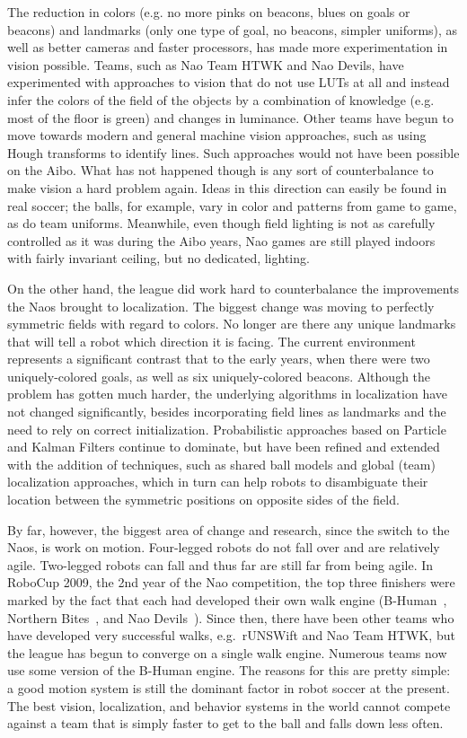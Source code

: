 \documentclass{llncs}
\begin{document}
The reduction in colors (e.g. no more pinks on beacons, blues on goals
or beacons) and landmarks (only one type of goal, no beacons,
simpler uniforms), as well as better cameras and faster processors, has
made more experimentation in vision possible. Teams, such as
Nao Team HTWK and Nao Devils, have experimented with approaches
to vision that do not use LUTs at all and instead infer the colors of the field
of the objects by a combination of knowledge (e.g. most of the floor
is green) and changes in luminance.  Other teams have begun to move towards 
modern and general machine
vision approaches, such as using Hough transforms to identify lines. Such approaches
would not have been possible on the Aibo.
What has not happened though is any sort of counterbalance to make vision
a hard problem again. Ideas in this direction can easily be found
in real soccer; the balls, for example, vary in color and patterns from game
to game, as do team uniforms. Meanwhile, even though field lighting is not as carefully
controlled as it was during the Aibo years, Nao games are still played indoors with
fairly invariant ceiling, but no dedicated, lighting.

On the other hand, the league did work hard to counterbalance the
improvements the Naos brought to localization. The biggest change
was moving to perfectly symmetric fields with regard to colors. No longer
are there any unique landmarks that will tell a robot which direction
it is facing. The current environment represents a significant 
contrast that to the early years, when there were two uniquely-colored
goals, as well as six uniquely-colored beacons. Although the problem has gotten
much harder, the underlying algorithms in localization have not changed significantly,
besides incorporating field lines as landmarks and the need to rely on correct initialization. 
Probabilistic approaches based on Particle and Kalman Filters continue
to dominate, but have been refined and extended with the addition of techniques, such
as shared ball models and global (team) localization approaches, which in turn can help robots to disambiguate
their location between the symmetric positions on opposite sides of the field.

By far, however, the biggest area of change and research, since the
switch to the Naos, is work on motion. Four-legged robots do not fall
over and are relatively agile. Two-legged robots can fall and thus far
are still far from being agile. In RoboCup 2009, the 2nd year of the Nao competition, the top three
finishers were marked by the fact that each had developed
their own walk engine (B-Human~\cite{NaoWalking-WHSR-2009}, Northern Bites~\cite{strom-10}, and
Nao Devils~\cite{czarnetzki}). Since then, there have been other teams who have developed
very successful walks, e.g.~rUNSWift and Nao Team HTWK,
but the league has begun to converge on a single walk engine. Numerous
teams now use some version of the B-Human engine. The reasons
for this are pretty simple: a good motion system is still the dominant factor
in robot soccer at the present. The best vision, localization, and behavior
systems in the world cannot compete against a team that is simply
faster to get to the ball and falls down less often.
\end{document}
